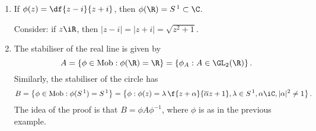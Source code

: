 \begin{examples}
\mbox{}
\begin{enumerate}
	\item If $\phi(z) = \df{z-i}{z+i}$, then $\phi(\R)=S^{\,1}\subset \C$.

	Consider: if $z\iR$, then $\left\vert z-i \right\vert = \left\vert z+i \right\vert = \sqrt{z^2+1}$.
	\item The stabiliser of the real line is given by
	\begin{equation*}
		A=\left\{\phi\in\Mobgp: \phi(\R)=\R\right\} = \left\{\phi_A: A\in\GL_2(\R)\right\}.
	\end{equation*}
	Similarly, the stabiliser of the circle has
	\begin{equation*}
		B
		= \left\{\phi\in\Mobgp: \phi(S^{\,1}) = S^{\,1}\right\}
		= \left\{\phi: \phi(z) = \lambda\,\f{z+\alpha}{\overline{\alpha}z+1}, \lambda\in S^{\,1}, \alpha\iC, |\alpha|^2\neq 1\right\}.
	\end{equation*}
	The idea of the proof is that $B=\phi A\phi^{-1}$, where $\phi$ is as in the previous example.
\end{enumerate}
\end{examples}

